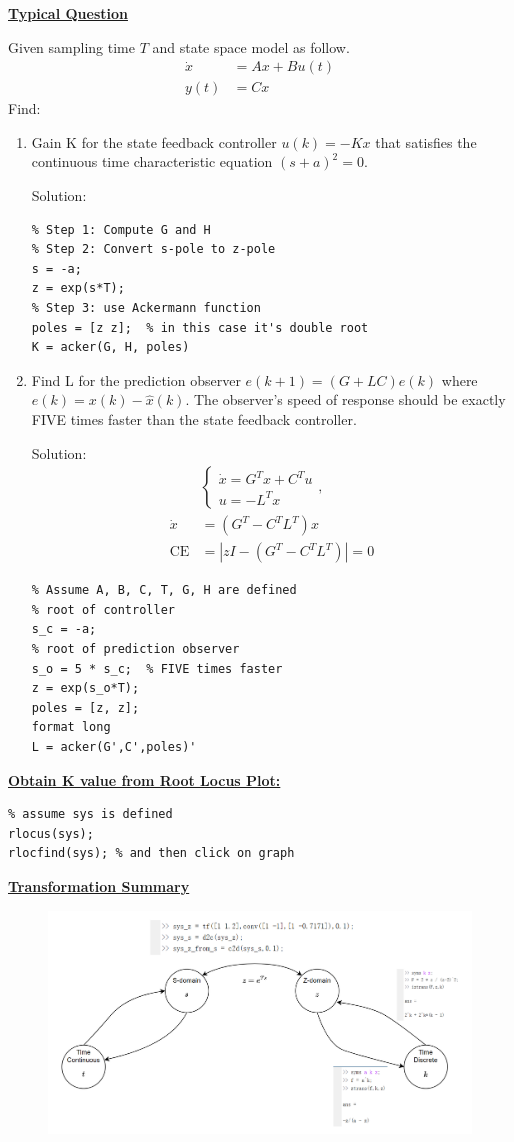\begin{center}\textbf{\large \underline{Typical Question}}\end{center} 
Given sampling time $T$ and state space model as follow. 
\begin{align*}
    \dot{x} &= Ax + B u(t) \\
    y(t) &= C x 
\end{align*}
Find:
\begin{enumerate}
    \item Gain K for the state feedback controller $u(k)=-Kx$ that satisfies the continuous time characteristic equation $(s+a)^2=0$.
    
    Solution:
\begin{lstlisting}
% Step 1: Compute G and H
% Step 2: Convert s-pole to z-pole
s = -a;
z = exp(s*T);
% Step 3: use Ackermann function
poles = [z z];  % in this case it's double root
K = acker(G, H, poles)  
\end{lstlisting}
    \item Find L for the prediction observer $e(k+1)=(G+LC)e(k)$ where $e(k)=x(k)-\hat{x}(k)$. The observer's speed of response should be exactly FIVE times faster than the state feedback controller. 
    
    Solution: 
    \begin{align*}
        &\begin{cases}
            \dot{x} = G^T x + C^T u \\
            u = -L^T x 
        \end{cases}, \\
        \dot{x} &= (G^T-C^T L^T)x \\
        \text{CE} &= |zI - (G^T - C^T L^T)| = 0
    \end{align*}
\begin{lstlisting}
% Assume A, B, C, T, G, H are defined
% root of controller
s_c = -a;
% root of prediction observer
s_o = 5 * s_c;  % FIVE times faster
z = exp(s_o*T);
poles = [z, z];
format long
L = acker(G',C',poles)'
\end{lstlisting}
\end{enumerate}





\textbf{\underline{Obtain K value from Root Locus Plot:}}
\vspace{0.3cm}
\begin{lstlisting}
% assume sys is defined
rlocus(sys);
rlocfind(sys); % and then click on graph
\end{lstlisting}


\textbf{\underline{Transformation Summary}}
\begin{figure}[h]
    \centering
    \includegraphics[width=1.0\linewidth]{images/transformation_Summary.png}
\end{figure}